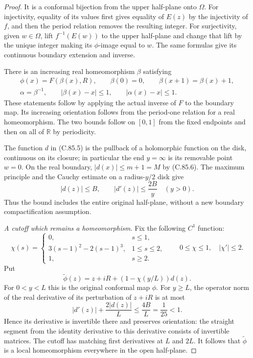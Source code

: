\begin{proof}
It is a conformal bijection from the
upper half-plane onto $\Omega$.
For injectivity, equality of its values
first gives equality of $E(z)$ by the
injectivity of $f$, and then the period
relation removes the resulting integer.
For surjectivity, given $w\in\Omega$,
lift $f^{-1}(E(w))$ to the upper half-plane
and change that lift by the unique integer
making its $\phi$-image equal to $w$.
The same formulas give its continuous
boundary extension and inverse.

There is an increasing real homeomorphism
$\beta$ satisfying
\[
 \begin{gathered}
 \phi(x)=F(\beta(x),R),\qquad
 \beta(0)=0,\qquad \beta(x+1)=\beta(x)+1,\\
 \alpha=\beta^{-1},\qquad
 |\beta(x)-x|\leq1,\qquad |\alpha(x)-x|\leq1.
 \end{gathered}                                                   \tag{C.85.6}
\]
These statements follow by applying the
actual inverse of $F$ to the boundary
map. Its increasing orientation follows
from the period-one relation for a real
homeomorphism. The two bounds follow on
$[0,1]$ from the fixed endpoints and then
on all of $\mathbb R$ by periodicity.

The function $d$ in (C.85.5) is the
pullback of a holomorphic function on
the disk, continuous on its closure;
in particular the end $y=\infty$ is
its removable point $w=0$.
On the real boundary,
$|d(x)|\leq m+1=M$ by (C.85.6).
The maximum principle and the Cauchy
estimate on a radius-$y/2$ disk give
\[
             |d(z)|\leq B,\qquad
             |d'(z)|\leq\frac{2B}{y}\quad(y>0).                 \tag{C.85.7}
\]
Thus the bound includes the entire
original half-plane, without a new
boundary compactification assumption.

\emph{A cutoff which remains a homeomorphism.}
Fix the following $C^1$ function:
\[
 \chi(s)=
 \begin{cases}
  0,&s\leq1,\\
  3(s-1)^2-2(s-1)^3,&1\leq s\leq2,\\
  1,&s\geq2.
 \end{cases}
 \qquad 0\leq\chi\leq1,\quad |\chi'|\leq2.
                                                                    \tag{C.85.8}
\]
Put
\[
            \widetilde\phi(z)
             =z+iR+(1-\chi(y/L))d(z).                            \tag{C.85.9}
\]
For $0<y<L$ this is the original conformal
map $\phi$. For $y\geq L$, the operator
norm of the real derivative of its
perturbation of $z+iR$ is at most
\[
         |d'(z)|+\frac{2|d(z)|}{L}
                    \leq\frac{4B}{L}=\frac1{25}<1.              \tag{C.85.10}
\]
Hence its derivative is invertible there
and preserves orientation: the straight
segment from the identity derivative to
this derivative consists of invertible
matrices. The cutoff has matching first
derivatives at $L$ and $2L$.
It follows that $\widetilde\phi$ is a
local homeomorphism everywhere in the
open half-plane.


\end{proof}
